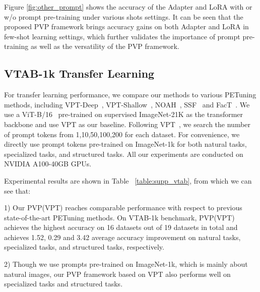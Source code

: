 \documentclass[10pt,journal,letterpaper,compsoc]{IEEEtran}
\begin{document}
Figure \ref{fig:other_prompt} shows the accuracy of the Adapter and LoRA with or w/o prompt pre-training under various shots settings. It can be seen that the proposed PVP framework brings accuracy gains on both Adapter and LoRA in few-shot learning settings, which further validates the importance of prompt pre-training as well as the versatility of the PVP framework.

\subsection{VTAB-1k Transfer Learning}
For transfer learning performance, we compare our methods to various PETuning methods, including VPT-Deep~\cite{vpt}, VPT-Shallow~\cite{vpt}, NOAH~\cite{NOAH}, SSF~\cite{SSF} and FacT~\cite{FacT}. We use a ViT-B/16~\cite{vit} pre-trained on supervised ImageNet-21K as the transformer backbone and use VPT as our baseline. Following VPT~\cite{vpt}, we search the number of prompt tokens from 1,10,50,100,200 for each dataset. For convenience, we directly use prompt tokens pre-trained on ImageNet-1k for both natural tasks, specialized tasks, and structured tasks. All our experiments are conducted on NVIDIA A100-40GB GPUs.


Experimental results are shown in Table ~\ref{table:supp_vtab}, from which we can see that:

1) Our PVP(VPT) reaches comparable performance with respect to previous state-of-the-art PETuning methods. On VTAB-1k benchmark, PVP(VPT) achieves the highest accuracy on 16 datasets out of 19 datasets in total and achieves 1.52, 0.29 and 3.42 average accuracy improvement on natural tasks, specialized tasks, and structured tasks, respectively.

2) Though we use prompts pre-trained on ImageNet-1k, which is mainly about natural images, our PVP framework based on VPT also performs well on specialized tasks and structured tasks.
\end{document}
